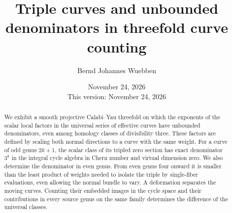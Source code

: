 \documentclass[11pt]{amsart}
\title[Triple curves and unbounded denominators]{Triple curves and unbounded denominators in threefold curve counting}
\author{Bernd Johannes Wuebben}
\date{November 24, 2026\\This version: November 24, 2026}
\theoremstyle{definition}
\theoremstyle{remark}
\begin{document}
\begin{abstract}
We exhibit a smooth projective Calabi--Yau threefold on which the
exponents of the scalar local factors in the universal series of
effective curves have unbounded denominators, even among homology
classes of divisibility three. These factors are defined by scaling
both normal directions to a curve with the same weight. For a curve of
odd genus $2k+1$, the scalar class of its tripled zero section has
exact denominator $3^k$ in the integral cycle algebra in Chern number
and virtual dimension zero. We also determine the denominator in even
genus. From even genus four onward it is smaller than the least
product of weights needed to isolate the triple by single-fiber
evaluations, even allowing the normal bundle to vary.
A deformation separates the moving curves. Counting their embedded
images in the cycle space and their contributions in every source
genus on the same family determines the difference of the universal classes.
\end{abstract}
\maketitle
\raggedbottom
\setcounter{tocdepth}{1}
\newpage
\tableofcontents
\newpage












\appendix






\end{document}
